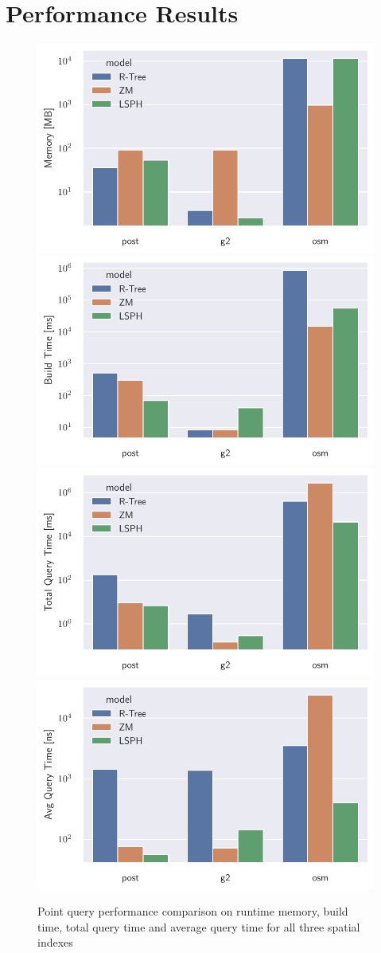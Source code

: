 \section{Performance Results}

\begin{figure}
    \includegraphics[width=.5\textwidth]{Figures/memory.pdf}\hfill
    \includegraphics[width=.5\textwidth]{Figures/build_time.pdf}
    \\[\smallskipamount]
    \includegraphics[width=.5\textwidth]{Figures/query_time.pdf}\hfill
    \includegraphics[width=.5\textwidth]{Figures/avg_query_time.pdf}
    \caption{Point query performance comparison on runtime memory, build time, total query time and average query time for all three spatial indexes}\label{fig:performance}
\end{figure}


